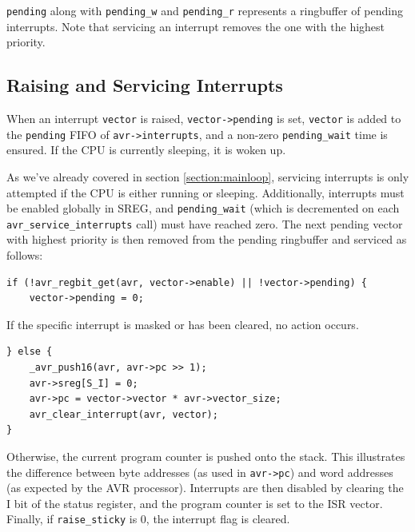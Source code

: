 \lstinline|pending| along with \lstinline|pending_w| and \lstinline|pending_r|
represents a ringbuffer of pending interrupts. Note that servicing an
interrupt removes the one with the highest priority.


\subsection{Raising and Servicing Interrupts}

When an interrupt \lstinline|vector| is raised, \lstinline|vector->pending| is
set, \lstinline|vector| is added to the \lstinline|pending| \ac{FIFO} of
\lstinline|avr->interrupts|, and a non-zero \lstinline|pending_wait| time is
ensured. If the \ac{CPU} is currently sleeping, it is woken up.

As we've already covered in section \ref{section:mainloop}, servicing interrupts is
only attempted if the \ac{CPU} is either running or sleeping. Additionally,
interrupts must be enabled globally in \ac{SREG}, and \lstinline|pending_wait|
(which is decremented on each \lstinline|avr_service_interrupts| call) must have
reached zero. The next pending vector with highest priority is then removed from
the pending ringbuffer and serviced as follows:

\begin{lstlisting}
if (!avr_regbit_get(avr, vector->enable) || !vector->pending) {
    vector->pending = 0;
\end{lstlisting}

If the specific interrupt is masked or has been cleared, no action occurs.

\begin{lstlisting}
} else {
    _avr_push16(avr, avr->pc >> 1);
    avr->sreg[S_I] = 0;
    avr->pc = vector->vector * avr->vector_size;
    avr_clear_interrupt(avr, vector);
}
\end{lstlisting}

Otherwise, the current program counter is pushed onto the stack. This illustrates
the difference between byte addresses (as used in \lstinline|avr->pc|) and
word addresses (as expected by the \ac{AVR} processor).
Interrupts are then disabled by clearing the I bit of the status register, and
the program counter is set to the \ac{ISR} vector. Finally, if
\lstinline|raise_sticky| is 0, the interrupt flag is cleared.

